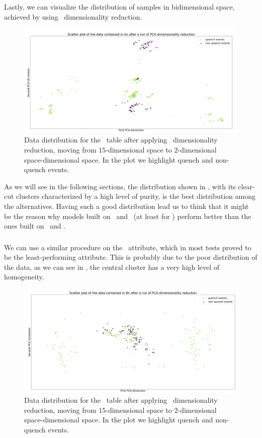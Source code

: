 Lastly, we can visualize the distribution of samples in bidimensional space, achieved by using \pca\
dimensionality reduction.
\begin{figure}[!ht]
	\centering
	\includegraphics[width=\linewidth]{img/An_distribution.png}
	\caption{Data distribution for the \an\ table after applying \pca\ dimensionality
		reduction, moving from $15$-dimensional space to $2$-dimensional space-dimensional
		space. In the plot we highlight quench and non-quench events.} \label{fig:an-dist}
\end{figure}

As we will see in the following sections, the distribution shown in , with its
clear-cut clusters characterized by a high level of purity, is the best distribution among the
alternatives. Having such a good distribution lead us to think that it might be the reason why
models built on \an\ and \cnmod\ (at least for \qrp) perform better than the ones built on \bn\ and
\phin.

\subsubsection{\bn}
We can use a similar procedure on the \bn\ attribute, which in most tests proved to be the
least-performing attribute. This is probably due to the poor distribution of the data, as we can see in
\Cref{fig:bn-dist}, the central cluster has a very high level of homogeneity.
\begin{figure}[!ht]
	\centering
	\includegraphics[width=\linewidth]{img/Bn_distribution.png}
	\caption{Data distribution for the \bn\ table after applying \pca\ dimensionality
		reduction, moving from $15$-dimensional space to $2$-dimensional space-dimensional
		space. In the plot we highlight quench and non-quench events.} \label{fig:bn-dist}
\end{figure}

